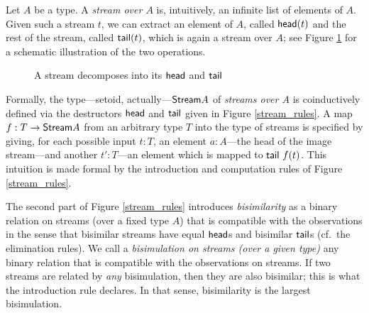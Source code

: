 \documentclass[a4paper,USenglish]{lipics}
\begin{document}
\begin{example}
 \label{ex_stream}
  Let $A$ be a type. A \emph{stream over $A$} is, intuitively, an infinite list of elements of $A$. 
  Given such a stream $t$, we can extract an element of $A$, called $\mathsf{head}(t)$ and the rest of the stream, called $\mathsf{tail}(t)$, which is again a stream over $A$; see Figure \ref{fig:stream} for a schematic illustration of the two operations.
  \begin{figure}[htb]
    \centering
   \caption{A stream decomposes into its $\mathsf{head}$ and $\mathsf{tail}$} \label{fig:stream}
  \end{figure}
  Formally, the type---setoid, actually---$\mathsf{Stream} A$ of \emph{streams over $A$} is coinductively defined via the destructors $\mathsf{head}$ and $\mathsf{tail}$
  given in Figure \ref{stream_rules}.  A map $f:T\to \mathsf{Stream} A$ from an arbitrary type $T$ into the type of streams is specified by giving, for each possible input $t:T$, 
  an element $a:A$---the head of the image stream---and another $t':T$---an element which is mapped to $\mathsf{tail}~f(t)$. This intuition is made formal by the 
  introduction and computation rules of Figure \ref{stream_rules}.
  
  The second part of Figure \ref{stream_rules} introduces \emph{bisimilarity} as a binary relation on streams (over a fixed type $A$) that is compatible with the observations
  in the sense that bisimilar streams have equal $\mathsf{head}$s and bisimilar $\mathsf{tail}$s (cf.\ the elimination rules). 
  We call a \emph{bisimulation on streams (over a given type)} any binary relation that is compatible with the observations on streams.
  If two streams are related by \emph{any} bisimulation,
  then they are also bisimilar; this is what the introduction rule declares. In that sense, bisimilarity is the largest bisimulation.


\end{example}
\end{document}
